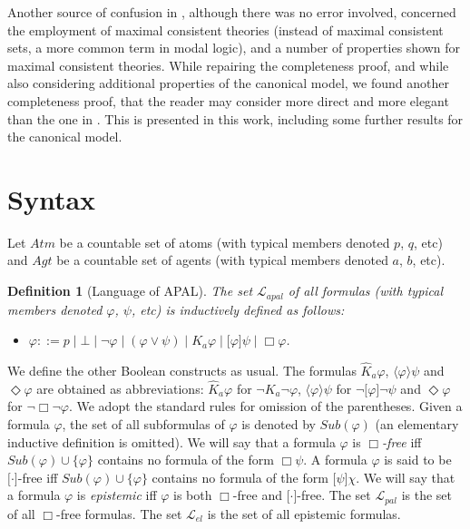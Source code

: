 \documentclass{article}[12pt]
\newtheorem{definition}{Definition}
\renewcommand{\phi}{\varphi}
\begin{document}
Another source of confusion in \cite{balbianietal:2008}, although there was no error involved, concerned the employment of maximal consistent theories (instead of maximal consistent sets, a more common term in modal logic), and a number of properties shown for maximal consistent theories. While repairing the completeness proof, and while also considering additional properties of the canonical model, we found another completeness proof, that the reader may consider more direct and more elegant than the one in \cite{balbianietal:2008,philippe.corrected:2014}. This is presented in this work, including some further results for the canonical model.

\section{Syntax}
Let $Atm$ be a countable set of atoms (with typical members denoted $p$, $q$, etc) and $Agt$ be a countable set of agents (with typical members denoted $a$, $b$, etc).

\begin{definition}[Language of APAL]
The set $\mathcal{L}_{apal}$ of all formulas (with typical members denoted $\phi$, $\psi$, etc) is inductively defined as follows: 
\begin{itemize}
\item $\phi::=p\mid\bot\mid\neg\phi\mid(\phi\vee\psi)\mid K_{a}\phi\mid\lbrack\phi\rbrack\psi\mid\Box\phi$.
\end{itemize}
\end{definition}
We define the other Boolean constructs as usual.
The formulas $\hat{K}_{a}\phi$, $\langle\phi\rangle\psi$ and $\Diamond\phi$ are obtained as abbreviations: $\hat{K}_{a}\phi$ for $\neg K_{a}\neg\phi$, $\langle\phi\rangle\psi$ for $\neg\lbrack\phi\rbrack\neg\psi$ and $\Diamond\phi$ for $\neg\Box\neg\phi$.
We adopt the standard rules for omission of the parentheses.
Given a formula $\phi$, the set of all subformulas of $\phi$ is denoted by $Sub(\phi)$ (an elementary inductive definition is omitted).
We will say that a formula $\phi$ is {\em $\Box$-free} iff $Sub(\phi)\cup\{\phi\}$ contains no formula of the form $\Box\psi$.
A formula $\phi$ is said to be $\lbrack\cdot\rbrack$-free iff $Sub(\phi)\cup\{\phi\}$ contains no formula of the form $\lbrack\psi\rbrack\chi$.
We will say that a formula $\phi$ is {\em epistemic} iff $\phi$ is both $\Box$-free and $\lbrack\cdot\rbrack$-free.
The set $\mathcal{L}_{pal}$ is the set of all $\Box$-free formulas.
The set $\mathcal{L}_{el}$ is the set of all epistemic formulas.
\end{document}
